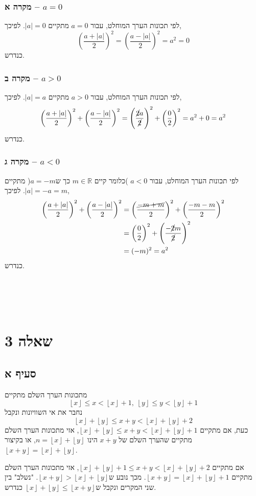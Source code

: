 \documentclass[11pt, oneside]{article}
\newcommand{\qed}{\R{$\blacksquare$}}
\newcommand{\br}{\\\\\\\\\\}
\newcommand{\mR}{\mathbb{R}}
\newcommand{\floor}[1]{\left\lfloor {#1} \right\rfloor}
\begin{document}
\subsubsection{מקרה א -- $a = 0$}
לפי תכונות הערך המוחלט, עבור $a = 0$ מתקיים $|a| = 0$. לפיכך,
\[
\left(\frac{a + |a|}{2}\right)^2 = \left(\frac{a - |a|}{2}\right)^2 = a^2 = 0
\]
כנדרש.
\subsubsection{מקרה ב -- $a > 0$}
לפי תכונות הערך המוחלט, עבור $a > 0$ מתקיים $|a| = a$. לפיכך,
\[
\left(\frac{a + |a|}{2}\right)^2 + \left(\frac{a - |a|}{2}\right)^2
= \left(\frac{\cancel{2}a}{\cancel{2}}\right)^2 + \left(\frac{0}{2}\right)^2
= a^2 + 0
= a^2
\]
כנדרש.
\subsubsection{מקרה ג -- $a < 0$}
לפי תכונות הערך המוחלט, עבור $a < 0$ )כלומר קיים $m \in \mR$ כך ש$a = -m$( מתקיים $|a| = -a = m$. לפיכך,
\begin{align*}
\left(\frac{a + |a|}{2}\right)^2 + \left(\frac{a - |a|}{2}\right)^2
&= \left(\frac{\cancel{-m + m}}{2}\right)^2 + \left(\frac{-m - m}{2}\right)^2\\
&= \left(\frac{0}{2}\right)^2 + \left(\frac{-\cancel{2}m}{\cancel{2}}\right)^2\\
&= (-m)^2 = a^2\\
\end{align*}
כנדרש.
\br\qed

\clearpage

\section{שאלה 3}
\subsection{סעיף א}
מתכונות הערך השלם מתקיים
\[
\floor{x} \le x < \floor{x} + 1,\;
\floor{y} \le y < \floor{y} + 1
\]
נחבר את אי השוויונות ונקבל
\[
\floor{x} + \floor{y} \le x + y < \floor{x} + \floor{y} + 2
\]
כעת, אם מתקיים $\floor{x} + \floor{y} \le x + y < \floor{x} + \floor{y} + 1$, אזי מתכונות הערך השלם מתקיים שהערך השלם של $x + y$ הינו $n = \floor{x} + \floor{y}$, או בקיצור $\floor{x + y} = \floor{x} + \floor{y}$.

אם מתקיים $\floor{x} + \floor{y} + 1 \le x + y < \floor{x} + \floor{y} + 2$, אזי מתכונות הערך השלם מתקיים $\floor{x + y} = \floor{x} + \floor{y} + 1$. מכך נובע ש$\floor{x + y} > \floor{x} + \floor{y}$. "נשלב" בין שני המקרים ונקבל ש$\floor{x} + \floor{y} \le \floor{x + y}$ כנדרש.
\br\qed
\end{document}
